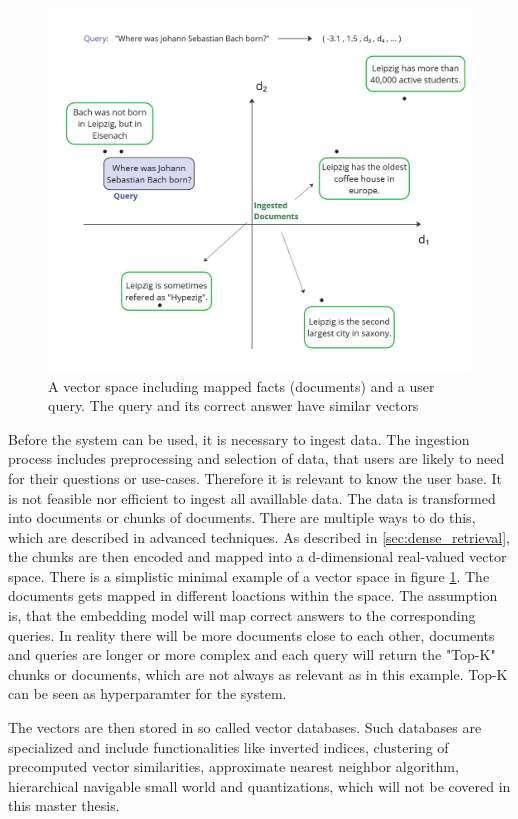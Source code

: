 \begin{figure}[h!]
    \centering
    \includegraphics[width=\textwidth]{images/VectorDB.jpg}
    \caption{A vector space including mapped facts (documents) and a user query. The query and its correct answer have similar vectors}
    \label{fig:vectorDB}
\end{figure}


Before the system can be used, it is necessary to ingest data. The ingestion process includes preprocessing and selection of data, that users are likely to need for their questions or use-cases. Therefore it is relevant to know the user base. It is not feasible nor efficient to ingest all availlable data. The data is transformed into documents or chunks of documents. There are multiple ways to do this, which are described in advanced techniques. As described in \ref{sec:dense_retrieval}, the chunks are then encoded and mapped into a d-dimensional real-valued vector space. There is a simplistic minimal example of a vector space in figure \ref{fig:vectorDB}. The documents gets mapped in different loactions within the space. The assumption is, that the embedding model will map correct answers to the corresponding queries. In reality there will be more documents close to each other, documents and queries are longer or more complex and each query will return the "Top-K" chunks or documents, which are not always as relevant as in this example. Top-K can be seen as hyperparamter for the system. 

The vectors are then stored in so called vector databases. Such databases are specialized and include functionalities like inverted indices, clustering of precomputed vector similarities, approximate nearest neighbor algorithm, hierarchical navigable small world and quantizations, which will not be covered in this master thesis.  


